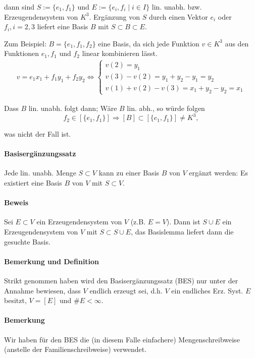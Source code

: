     dann sind $S:= \{e_1,f_1\}$ und $E:= \{e_i,f_i\mid i\in I\}$ lin. unabh. bzw. Erzeugendensystem von $K^3$. Ergänzung von $S$ durch einen Vektor $e_i$ oder $f_i, i = 2,3$ liefert eine Basis $B$ mit $S\subset B\subset E$.
    
    Zum Beispiel: $B=\{e_1,f_1,f_2\}$ eine Basis, da sich jede Funktion $v\in K^3$ aus den Funktionen $e_1,f_1$ und $f_2$ linear kombinieren lässt.
    \begin{gather*}
        v=e_1x_1+f_1y_1 + f_2y_2\Leftrightarrow \left\{
            \begin{array}{l}
                v(2)=y_1\\
                v(3) - v(2) = y_1 + y_2 - y_1 = y_2\\
                v(1) + v(2) - v(3) = x_1 + y_2 - y_2 = x_1
            \end{array}
    	\right.
    \end{gather*}

    Dass $B$ lin. unabh. folgt dann; Wäre $B$ lin. abh., so würde folgen
    \begin{equation*}
        f_2\in [\{e_1,f_1\}]\Rightarrow [B] \subset [\{e_1,f_1\}] \neq K^3,
    \end{equation*}

    was nicht der Fall ist.

\paragraph{Basisergänzungssatz}
    Jede lin. unabh. Menge $S\subset V$ kann zu einer Basis $B$ von $V$ ergänzt werden: Es existiert eine Basis $B$ von $V$ mit $S\subset V$.

\paragraph{Beweis}
    Sei $E\subset V$ ein Erzeugendensystem von $V$ (z.B. $E=V$). Dann ist $S\cup E$ ein Erzeugendensystem von $V$ mit $S\subset S\cup E$, das Basislemma liefert dann die gesuchte Basis.

\paragraph{Bemerkung und Definition}
    Strikt genommen haben wird den Basisergänzungssatz (BES) nur unter der Annahme bewiesen, dass $V$ endlich erzeugt sei, d.h. $V$ ein endliches Erz. Syst. $E$ besitzt, $V=[E]$ und $\#E<\infty$.
\paragraph{Bemerkung}
    Wir haben für den BES die (in diesem Falle einfachere) Mengenschreibweise (anstelle der Familienschreibweise) verwendet.
